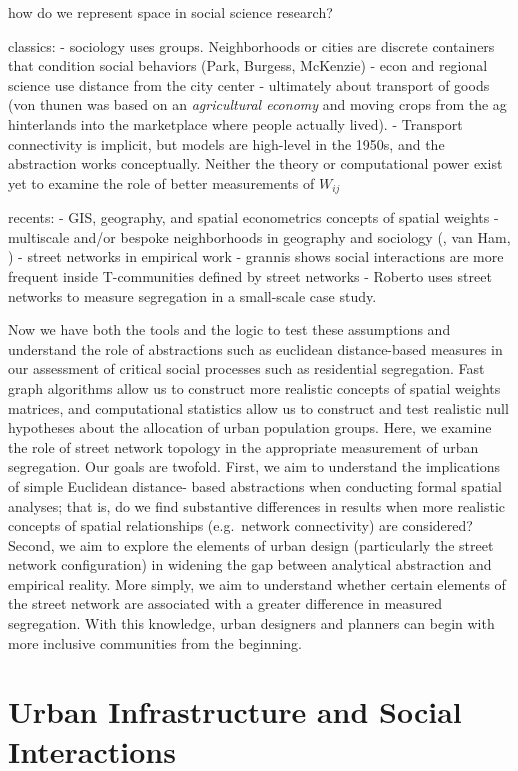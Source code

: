 \documentclass[
  10pt,
]{article}
\begin{document}
how do we represent space in social science research?

classics: - sociology uses groups. Neighborhoods or cities are discrete
containers that condition social behaviors (Park, Burgess, McKenzie) -
econ and regional science use distance from the city center - ultimately
about transport of goods (von thunen was based on an \emph{agricultural
economy} and moving crops from the ag hinterlands into the marketplace
where people actually lived). - Transport connectivity is implicit, but
models are high-level in the 1950s, and the abstraction works
conceptually. Neither the theory or computational power exist yet to
examine the role of better measurements of \(W_{ij}\)

recents: - GIS, geography, and spatial econometrics concepts of spatial
weights - multiscale and/or bespoke neighborhoods in geography and
sociology (\citet{HIPP_2013}, van Ham, ) - street networks in empirical
work - grannis shows social interactions are more frequent inside
T-communities defined by street networks - Roberto uses street networks
to measure segregation in a small-scale case study.

Now we have both the tools and the logic to test these assumptions and
understand the role of abstractions such as euclidean distance-based
measures in our assessment of critical social processes such as
residential segregation. Fast graph algorithms allow us to construct
more realistic concepts of spatial weights matrices, and computational
statistics allow us to construct and test realistic null hypotheses
about the allocation of urban population groups. Here, we examine the
role of street network topology in the appropriate measurement of urban
segregation. Our goals are twofold. First, we aim to understand the
implications of simple Euclidean distance- based abstractions when
conducting formal spatial analyses; that is, do we find substantive
differences in results when more realistic concepts of spatial
relationships (e.g.~network connectivity) are considered? Second, we aim
to explore the elements of urban design (particularly the street network
configuration) in widening the gap between analytical abstraction and
empirical reality. More simply, we aim to understand whether certain
elements of the street network are associated with a greater difference
in measured segregation. With this knowledge, urban designers and
planners can begin with more inclusive communities from the beginning.

\hypertarget{urban-infrastructure-and-social-interactions}{%
\section{Urban Infrastructure and Social
Interactions}\label{urban-infrastructure-and-social-interactions}}
\end{document}
